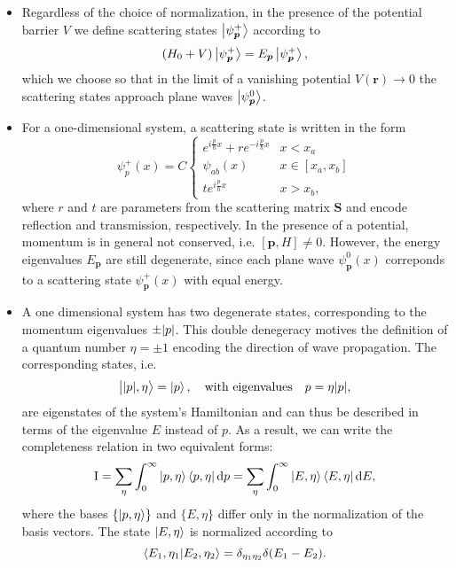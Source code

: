 \documentclass[11pt, a4paper]{article}
\newcommand{\diff}{\mathop{}\!\mathrm{d}} %
\renewcommand{\vec}[1]{\bm{#1}}  %
\newcommand{\mat}[1]{\mathbf{#1}}  %
\renewcommand{\SS}{\mat{S}}  %
\newcommand{\II}{\operatorname{I}}  %
\newcommand{\bket}[1]{\big | {#1} \big \rangle }
\begin{document}
\begin{itemize}
    \item Regardless of the choice of normalization, in the presence of the potential barrier $ V $ we define scattering states $ \ket{\psi_{\vec{p}}^{+}} $ according to
    \begin{equation*}
        (H_{0} + V) \ket{\psi_{\vec{p}}^{+}} = E_{\vec{p}}\ket{\psi_{\vec{p}}^{+}},
    \end{equation*}
    which we choose so that in the limit of a vanishing potential $ V(\vec{r}) \to 0 $ the scattering states approach plane waves $ \ket{\psi_{\vec{p}}^{0}} $. 

    \item For a one-dimensional system, a scattering state is written in the form
    \begin{equation*}
        \psi_{p}^{+}(x) = C
        \begin{cases}
            e^{i \frac{p}{\hbar} x} + r e^{-i \frac{p}{\hbar} x} & x < x_{a}\\
            \psi_{ab}(x) & x \in [x_{a}, x_{b}]\\
            t e^{i \frac{p}{\hbar}x} & x > x_{b},
        \end{cases}
    \end{equation*}
    where $ r $ and $ t $ are parameters from the scattering matrix $ \SS $ and encode reflection and transmission, respectively. In the presence of a potential, momentum is in general not conserved, i.e. $ [\vec{p}, H] \neq 0 $. However, the energy eigenvalues $ E_{\vec{p}} $ are still degenerate, since each plane wave $ \psi_{\vec{p}}^{0}(x) $ correponds to a scattering state $ \psi_{\vec{p}}^{+}(x) $ with equal energy.

    \item A one dimensional system has two degenerate states, corresponding to the momentum eigenvalues $ \pm \abs{p} $. This double denegeracy motives the definition of a quantum number $ \eta = \pm 1$ encoding the direction of wave propagation. The corresponding states, i.e.
    \begin{equation*}
        \bket{\abs{p}, \eta} = \ket{p}, \quad \text{with eigenvalues} \quad p = \eta \abs{p},
    \end{equation*}
    are eigenstates of the system's Hamiltonian and can thus be described in terms of the eigenvalue $ E $ instead of $ p $. As a result, we can write the completeness relation in two equivalent forms:
    \begin{equation*}
        \II = \sum_{\eta} \int_{0}^{\infty} \ket{p, \eta} \bra{p, \eta} \diff p = \sum_{\eta} \int_{0}^{\infty} \ket{E, \eta} \bra{E, \eta} \diff E,
    \end{equation*}
    where the bases $ \{\ket{p, \eta}\} $ and $ \{E, \eta\} $ differ only in the normalization of the basis vectors. The state $ \ket{E, \eta} $ is normalized according to
    \begin{equation*}
        \braket{E_{1}, \eta_{1}}{E_{2}, \eta_{2}} = \delta_{\eta_{1}\eta_{2}}\delta(E_{1} -E_{2}).
    \end{equation*}


\end{itemize}
\end{document}

